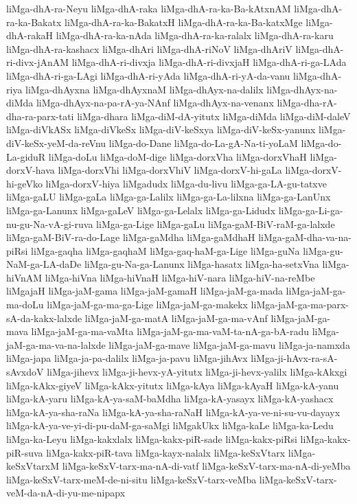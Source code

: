 {liMga-dhA-ra-Neyu
liMga-dhA-raka
liMga-dhA-ra-ka-Ba-kAtxnAM
liMga-dhA-ra-ka-Bakatx
liMga-dhA-ra-ka-BakatxH
liMga-dhA-ra-ka-Ba-katxMge
liMga-dhA-rakaH
liMga-dhA-ra-ka-nAda
liMga-dhA-ra-ka-ralalx
liMga-dhA-ra-karu
liMga-dhA-ra-kashacx
liMga-dhAri
liMga-dhA-riNoV
liMga-dhAriV
liMga-dhA-ri-divx-jAnAM
liMga-dhA-ri-divxja
liMga-dhA-ri-divxjaH
liMga-dhA-ri-ga-LAda
liMga-dhA-ri-ga-LAgi
liMga-dhA-ri-yAda
liMga-dhA-ri-yA-da-vanu
liMga-dhA-riya
liMga-dhAyxna
liMga-dhAyxnaM
liMga-dhAyx-na-dalilx
liMga-dhAyx-na-diMda
liMga-dhAyx-na-pa-rA-ya-NAnf
liMga-dhAyx-na-venanx
liMga-dha-rA-dha-ra-parx-tati
liMga-dhara
liMga-diM-dA-yitutx
liMga-diMda
liMga-diM-daleV
liMga-diVkASx
liMga-diVkeSx
liMga-diV-keSxya
liMga-diV-keSx-yanunx
liMga-diV-keSx-yeM-da-reVnu
liMga-do-Dane
liMga-do-La-gA-Na-ti-yoLaM
liMga-do-La-giduR
liMga-doLu
liMga-doM-dige
liMga-dorxVha
liMga-dorxVhaH
liMga-dorxV-hava
liMga-dorxVhi
liMga-dorxVhiV
liMga-dorxV-hi-gaLa
liMga-dorxV-hi-geVko
liMga-dorxV-hiya
liMgadudx
liMga-du-livu
liMga-ga-LA-gu-tatxve
liMga-gaLU
liMga-gaLa
liMga-ga-Lalilx
liMga-ga-La-lilxna
liMga-ga-LanUnx
liMga-ga-Lanunx
liMga-gaLeV
liMga-ga-Lelalx
liMga-ga-Lidudx
liMga-ga-Li-ga-nu-gu-Na-vA-gi-ruva
liMga-ga-Lige
liMga-gaLu
liMga-gaM-BiV-raM-ga-lalxde
liMga-gaM-BiV-ra-do-Lage
liMga-gaMdha
liMga-gaMdhaH
liMga-gaM-dha-va-na-piRsi
liMga-gaqha
liMga-gaqhaM
liMga-gaq-haM-ga-Lige
liMga-guNa
liMga-gu-NaM-ga-LA-daDe
liMga-gu-Na-ga-Lanunx
liMga-hasatx
liMga-ha-setxVna
liMga-hiVnAM
liMga-hiVna
liMga-hiVnaH
liMga-hiV-nara
liMga-hiV-na-reMbe
liMgajaH
liMga-jaM-gama
liMga-jaM-gamaH
liMga-jaM-ga-mada
liMga-jaM-ga-ma-doLu
liMga-jaM-ga-ma-ga-Lige
liMga-jaM-ga-makekx
liMga-jaM-ga-ma-parx-sA-da-kakx-lalxde
liMga-jaM-ga-matA
liMga-jaM-ga-ma-vAnf
liMga-jaM-ga-mava
liMga-jaM-ga-ma-vaMta
liMga-jaM-ga-ma-vaM-ta-nA-ga-bA-radu
liMga-jaM-ga-ma-va-na-lalxde
liMga-jaM-ga-mave
liMga-jaM-ga-mavu
liMga-ja-namxda
liMga-japa
liMga-ja-pa-dalilx
liMga-ja-pavu
liMga-jihAvx
liMga-ji-hAvx-ra-sA-sAvxdoV
liMga-jihevx
liMga-ji-hevx-yA-yitutx
liMga-ji-hevx-yalilx
liMga-kAkxgi
liMga-kAkx-giyeV
liMga-kAkx-yitutx
liMga-kAya
liMga-kAyaH
liMga-kA-yanu
liMga-kA-yaru
liMga-kA-ya-saM-baMdha
liMga-kA-yasayx
liMga-kA-yashacx
liMga-kA-ya-sha-raNa
liMga-kA-ya-sha-raNaH
liMga-kA-ya-ve-ni-su-vu-dayayx
liMga-kA-ya-ve-yi-di-pu-daM-ga-saMgi
liMgakUkx
liMga-kaLe
liMga-ka-Ledu
liMga-ka-Leyu
liMga-kakxlalx
liMga-kakx-piR-sade
liMga-kakx-piRsi
liMga-kakx-piR-suva
liMga-kakx-piR-tava
liMga-kayx-nalalx
liMga-keSxVtarx
liMga-keSxVtarxM
liMga-keSxV-tarx-ma-nA-di-vatf
liMga-keSxV-tarx-ma-nA-di-yeMba
liMga-keSxV-tarx-meM-de-ni-situ
liMga-keSxV-tarx-veMba
liMga-keSxV-tarx-veM-da-nA-di-yu-me-nipapx
}
